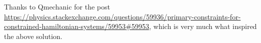 \documentclass{book}
\begin{document}
\begin{enumerate}[(a)]
\end{enumerate}

Thanks to Qmechanic for the post \url{https://physics.stackexchange.com/questions/59936/primary-constraints-for-constrained-hamiltonian-systems/59953#59953}, which is very much what inspired the above solution. 
\end{document}
